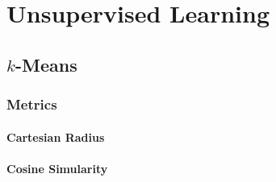 \chapter{Unsupervised Learning}
\label{ml:unsupervised}

\section{\texorpdfstring{$k$}{k}-Means}
\label{ml:unsupervised:kMean}

\subsection{Metrics}
\label{ml:unsupervised:kMean:metrics}

\subsubsection{Cartesian Radius}
\label{ml:unsupervised:kMean:metrics:cartesian}


\subsubsection{Cosine Simularity}
\label{ml:unsupervised:kMean:metrics:cos}


